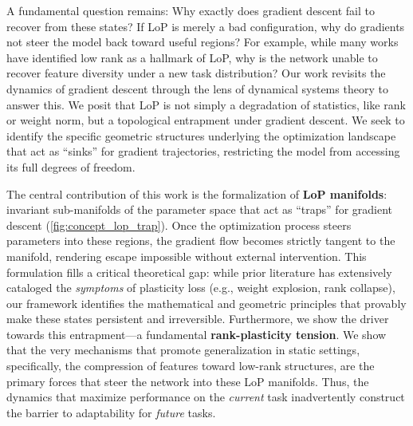 \documentclass{article}
\newcommand{\Loss}{\mathcal{L}}
\numberwithin{figure}{section}
\begin{document}
A fundamental question remains: Why exactly does gradient descent fail to recover from these states? If LoP is merely a bad configuration, why do gradients not steer the model back toward useful regions? For example, while many works have identified low rank as a hallmark of LoP, why is the network unable to recover feature diversity under a new task distribution? Our work revisits the dynamics of gradient descent through the lens of dynamical systems theory to answer this. We posit that LoP is not simply a degradation of statistics, like rank or weight norm, but a topological entrapment under gradient descent. We seek to identify the specific geometric structures underlying the optimization landscape that act as ``sinks'' for gradient trajectories, restricting the model from accessing its full degrees of freedom.

The central contribution of this work is the formalization of \textbf{LoP manifolds}: invariant sub-manifolds of the parameter space that act as ``traps'' for gradient descent (\cref{fig:concept_lop_trap}). Once the optimization process steers parameters into these regions, the gradient flow becomes strictly tangent to the manifold, rendering escape impossible without external intervention. This formulation fills a critical theoretical gap: while prior literature has extensively cataloged the \emph{symptoms} of plasticity loss (e.g., weight explosion, rank collapse), our framework identifies the mathematical and geometric principles that provably make these states persistent and irreversible. Furthermore, we show the driver towards this entrapment—a fundamental \textbf{rank-plasticity tension}. We show that the very mechanisms that promote generalization in static settings, specifically, the compression of features toward low-rank structures, are the primary forces that steer the network into these LoP manifolds. Thus, the dynamics that maximize performance on the \emph{current} task inadvertently construct the barrier to adaptability for \emph{future} tasks.
\end{document}
